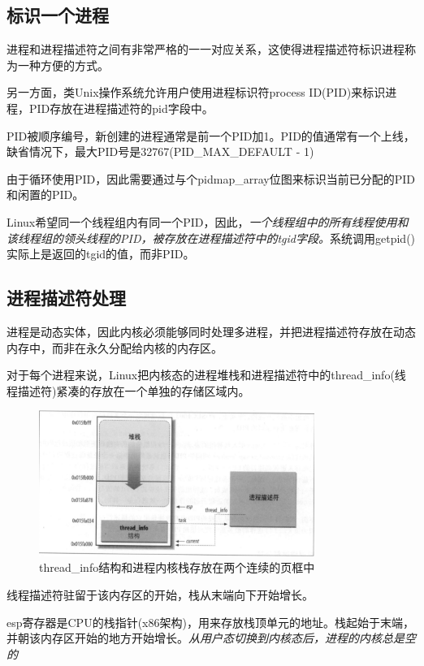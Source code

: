 \subsection{标识一个进程}

    进程和进程描述符之间有非常严格的一一对应关系，这使得进程描述符标识进程称为一种方便的方式。

    另一方面，类Unix操作系统允许用户使用进程标识符process ID(PID)来标识进程，PID存放在进程描述符的pid字段中。

    PID被顺序编号，新创建的进程通常是前一个PID加1。PID的值通常有一个上线，缺省情况下，最大PID号是32767(PID\_MAX\_DEFAULT - 1)

    由于循环使用PID，因此需要通过与个pidmap\_array位图来标识当前已分配的PID和闲置的PID。

    Linux希望同一个线程组内有同一个PID，因此，\emph{一个线程组中的所有线程使用和该线程组的领头线程的PID，被存放在进程描述符中的tgid字段。}系统调用getpid()实际上是返回的tgid的值，而非PID。

\subsection{进程描述符处理}

    进程是动态实体，因此内核必须能够同时处理多进程，并把进程描述符存放在动态内存中，而非在永久分配给内核的内存区。

    对于每个进程来说，Linux把内核态的进程堆栈和进程描述符中的thread\_info(线程描述符)紧凑的存放在一个单独的存储区域内。

\begin{figure}[!htbp]
    \centering
    \includegraphics[width=0.8\textwidth]{image/chapter03/thread_info与进程内核栈.png}
    \caption{thread\_info结构和进程内核栈存放在两个连续的页框中}
\end{figure}

    线程描述符驻留于该内存区的开始，栈从末端向下开始增长。

    esp寄存器是CPU的栈指针(x86架构)，用来存放栈顶单元的地址。栈起始于末端，并朝该内存区开始的地方开始增长。\emph{从用户态切换到内核态后，进程的内核总是空的}

